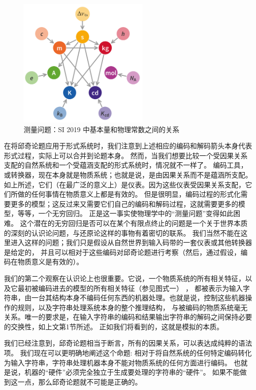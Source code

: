 \documentclass[a4paper,12pt]{article}
\begin{document}
\begin{figure}[ht]
\centering
\includegraphics[height=2.5in]{images/unit_relations_SI.png}
\caption{测量问题：SI 2019 中基本量和物理常数之间的关系}
\end{figure}

在将邱奇论题应用于形式系统时，我们注意到上述相应的编码和解码箭头本身代表形式过程，实际上可以合并到论题本身。
然而，当我们想要比较一个受因果关系支配的自然系统和一个受蕴涵支配的形式系统时，情况就不一样了。
编码工具，或转换器，现在本身就是物质系统；也就是说，是由因果关系而不是蕴涵所支配。
如上所述，它们（在最广泛的意义上）是仪表。因为这些仪表受因果关系支配，它们所做的任何事情在物质意义上都是有效的。
但是很明显，编码过程的形式化需要更多的模型；这反过来又需要它们自己的编码和解码过程，这就需要更多的模型，等等，一个无穷回归。
正是这一事实使物理学中的“测量问题”变得如此困难。
这个潜在的无穷回归是否可以在某个有限点终止的问题是一个关于世界本质的深刻的认识论问题，与还原论这样的事物有着密切的联系。
我们当然不能在这里进入这样的问题；我们只是假设从自然世界到输入码带的一套仪表或其他转换器是给定的，
并且可以相对于这些编码对邱奇论题进行考察（然后，通过假设，编码在物质意义是有效的）。

我们的第二个观察在认识论上也很重要。它说，一个物质系统的所有相关特征，以及它最初被编码进去的模型的所有相关特征（参见图式一） ，
都被表示为输入字符串，由一台其结构本身不编码任何东西的机器处理。也就是说，控制这些机器操作的规则，以及字符串处理系统本身的整个推理结构，
与被编码的物质系统毫无关系。唯一的要求是，在输入字符串的编码和结果输出字符串的解码之间保持必要的交换性，如上文第1节所述。
正如我们将看到的，这就是模拟的本质。

我们已经注意到，邱奇论题相当于断言，所有的因果关系，可以表达成纯粹的语法项。
我们现在可以更明确地阐述这个命题: 相对于将自然系统的任何特定编码转化为输入字符串，字符串处理机器本身不能对物质系统的任何方面进行编码。
也就是说，机器的“硬件”必须完全独立于生成要处理的字符串的“硬件”。 如果不能做到这一点，那么邱奇论题就不可能是正确的。
\end{document}
